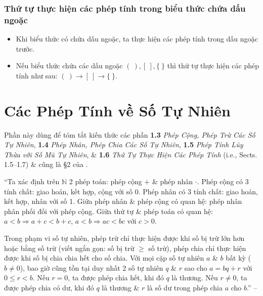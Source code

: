 \documentclass{article}
\numberwithin{equation}{section}
\begin{document}
\subsubsection{Thứ tự thực hiện các phép tính trong biểu thức chứa dấu ngoặc}
\begin{tcolorbox}
	\begin{itemize}
		\item Khi biểu thức có chứa dấu ngoặc, ta thực hiện các phép tính trong dấu ngoặc trước.
		\item Nếu biểu thức chứa các dấu ngoặc $(\ ),[\ ],\{\ \}$ thì thứ tự thực hiện các phép tính như sau: $(\ )\to[\ ]\to\{\ \}$.
	\end{itemize}	
\end{tcolorbox}


\section*{Các Phép Tính về Số Tự Nhiên}
Phần này dùng để tóm tắt kiến thức các phần \textbf{1.3} \textit{Phép Cộng, Phép Trừ Các Số Tự Nhiên}, \textbf{1.4} \textit{Phép Nhân, Phép Chia Các Số Tự Nhiên}, \textbf{1.5} \textit{Phép Tính Lũy Thừa với Số Mũ Tự Nhiên}, \& \textbf{1.6} \textit{Thứ Tự Thực Hiện Các Phép Tính} (i.e., Sects. 1.5--1.7) \& cũng là \S2 của \cite{Binh_Toan_6_tap_1}.

``Ta xác định trên $\mathbb{N}$ 2 phép toán: phép cộng $+$ \& phép nhân $\cdot$. Phép cộng có 3 tính chất: giao hoán, kết hợp, cộng với số 0. Phép nhân có 3 tính chất: giao hoán, kết hợp, nhân với số 1. Giữa phép nhân \& phép cộng có quan hệ: phép nhân phân phối đối với phép cộng. Giữa thứ tự \& phép toán có quan hệ: $a < b\Rightarrow a + c < b + c$, $a < b\Rightarrow ac < bc$ với $c > 0$.

Trong phạm vi số tự nhiên, phép trừ chỉ thực hiện được khi số bị trừ lớn hơn hoặc bằng số trừ (viết ngắn gọn: số bị  trừ $\ge$ số trừ), phép chia chỉ thực hiện được khi số bị chia chia hết cho số chia. Với mọi cặp số tự nhiên $a$ \& $b$ bất kỳ ($b\ne 0$), bao giờ cũng tồn tại duy nhất 2 số tự nhiên $q$ \& $r$ sao cho $a = bq + r$ với $0\le r < b$. Nếu $r = 0$, ta được phép chia hết, khi đó $q$ là thương. Nếu $r\ne 0$, ta được phép chia có dư, khi đó $q$ là thương \& $r$ là số dư trong phép chia $a$ cho $b$.'' -- \cite[p. 9]{Binh_Toan_6_tap_1}
\end{document}
